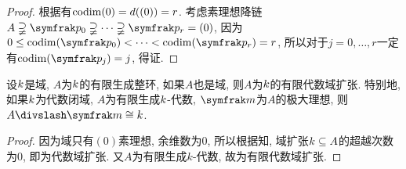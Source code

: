 \begin{proof}
  根据有$\operatorname{codim} (0)=d((0))=r$. 考虑素理想降链$A\supsetneqq \ideal{p}_0\supsetneqq \dotsb\supsetneqq \ideal{p}_r=(0)$, 因为$0\leq \codim (\ideal{p}_0)< \dotsb <\codim (\ideal{p}_r)=r$, 所以对于$j=0, \dotsc, r$一定有$\codim (\ideal{p}_j)=j$, 得证.
\end{proof}

\begin{theorem}\label{thm:hilbert-nullstellensatz-weak}
  设$k$是域, $A$为$k$的有限生成整环, 如果$A$也是域, 则$A$为$k$的有限代数域扩张. 特别地, 如果$k$为代数闭域, $A$为有限生成$k$-代数, $\ideal{m}$为$A$的极大理想, 则$A{\divslash}\ideal{m}\cong \field{k}$.
\end{theorem}

\begin{proof}
  因为域只有$(0)$素理想, 余维数为0, 所以根据知, 域扩张$k\subseteq A$的超越次数为0, 即为代数域扩张. 又$A$为有限生成$k$-代数, 故为有限代数域扩张.
\end{proof}







